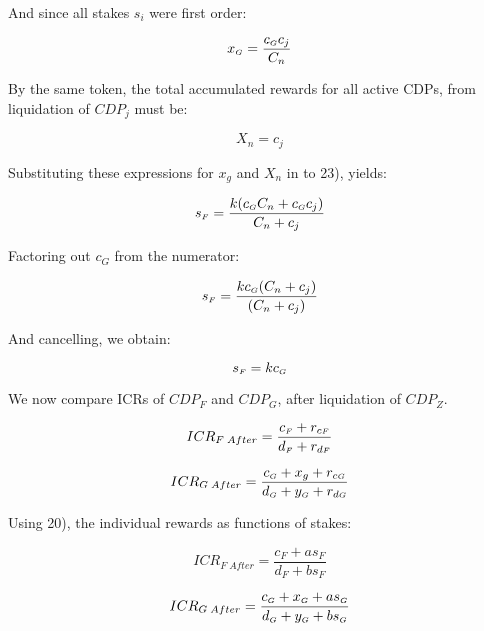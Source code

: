 \documentclass[reqno]{article}
\begin{document}
\bigskip
And since all stakes $s_i$ were first order:

\begin{equation} 
    x_\mathsmaller{G}=\frac{c_\mathsmaller{G}c_j}{C_n}
\end{equation}

\bigskip
By the same token, the total accumulated rewards for all active CDPs, from liquidation of $CDP_j$ must be:

\begin{equation} 
    X_n=c_j
\end{equation}

\bigskip
Substituting these expressions for $x_g$ and $X_n$ in to 23), yields:

\begin{equation} 
        s_\mathsmaller{F}=\frac{k(c_\mathsmaller{G}C_n+c_\mathsmaller{G}c_j)}{C_n+c_j}
\end{equation}

\bigskip
Factoring out $c_G$ from the numerator:

\begin{equation} 
    s_\mathsmaller{F}=\frac{k c_\mathsmaller{G}(C_n+c_j)}{(C_n+c_j)}
\end{equation}

\bigskip
And cancelling, we obtain:

\begin{equation} 
    s_\mathsmaller{F}=kc_\mathsmaller{G}
\end{equation}

\bigskip
We now compare ICRs of $CDP_F$ and $CDP_G$, after liquidation of $CDP_Z$.

\begin{equation} 
    ICR_{F \; After}=\frac{c_\mathsmaller{F}+r_{c\mathsmaller{F}}}{d_\mathsmaller{F}+r_{d\mathsmaller{F}}}
\end{equation}

\begin{equation} 
    ICR_{G \; After}=\frac{c_\mathsmaller{G}+x_g+r_{c\mathsmaller{G}}}{d_\mathsmaller{G}+y_\mathsmaller{G}+r_{d\mathsmaller{G}}}
\end{equation}

\bigskip
Using 20), the individual rewards as functions of stakes:

\begin{equation} 
    ICR_{F \; After}=\frac{c_F+as_F}{d_F+bs_F}
\end{equation}

\begin{equation} 
    ICR_{G \; After}=\frac{c_\mathsmaller{G}+x_\mathsmaller{G}+as_\mathsmaller{G}}{d_\mathsmaller{G}+y_\mathsmaller{G}+bs_\mathsmaller{G}}
\end{equation}
\end{document}
